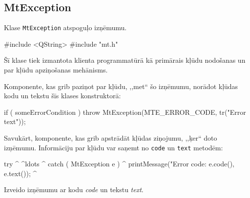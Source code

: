 \subsection{MtException}
Klase \verb+MtException+ atspoguļo izņēmumu.
\begin{includes}
#include <QString>
#include "mt.h"
\end{includes}

\publicmethods
\begin{memblist}
\end{memblist}

\classdescription
Šī klase tiek izmantota klienta programmatūrā kā primārais kļūdu nodošanas un
par kļūdu apziņošanas mehānisms.

Komponente, kas grib paziņot par kļūdu, ,,met`` šo izņēmumu, norādot kļūdas kodu
un tekstu šīs klases konstruktorā:
\begin{code}
if ( someErrorCondition )
	throw MtException(MTE_ERROR_CODE, tr("Error text"));
\end{code}

Savukārt, komponente, kas grib apstrādāt kļūdas ziņojumu, ,,ķer`` doto izņēmumu.
Informāciju par kļūdu var saņemt no \verb+code+ un \verb+text+ metodēm:
\begin{code}[commandchars=^\{\}]
try ^{
	^ldots
^} catch ( MtException e ) ^{
	printMessage("Error code: %
	             e.code(), e.text());
^}
\end{code}

\methoddescription
{}%
Izveido izņēmumu ar kodu \emph{code} un tekstu \emph{text}.

